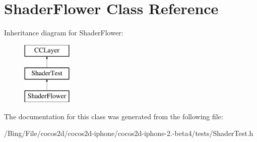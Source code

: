 \hypertarget{interface_shader_flower}{\section{Shader\-Flower Class Reference}
\label{interface_shader_flower}
}
Inheritance diagram for Shader\-Flower\-:\begin{figure}[H]
\begin{center}
\leavevmode
\includegraphics[height=3.000000cm]{interface_shader_flower}
\end{center}
\end{figure}


The documentation for this class was generated from the following file\-:\begin{DoxyCompactItemize}
\item 
/\-Bing/\-File/cocos2d/cocos2d-\/iphone/cocos2d-\/iphone-\/2.-\/beta4/tests/Shader\-Test.\-h\end{DoxyCompactItemize}
